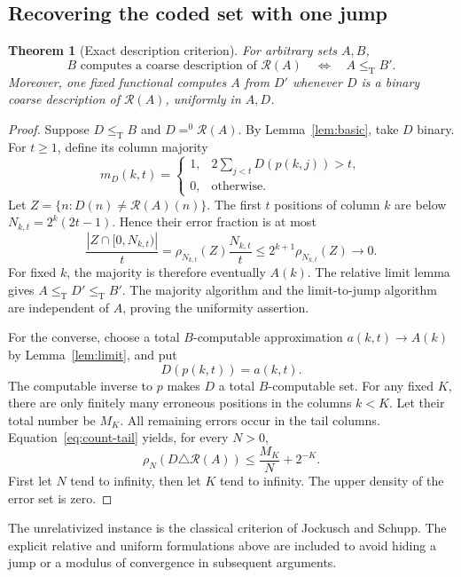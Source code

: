 \documentclass[11pt,a4paper]{article}
\newcommand{\leT}{\leq_{\mathrm T}}
\newcommand{\az}{\mathrel{=^{0}}}
\newcommand{\R}{\mathcal R}
\newtheorem{theorem}{Theorem}[section]
\theoremstyle{definition}\newtheorem{definition}[theorem]{Definition}
\theoremstyle{remark}\newtheorem{remark}[theorem]{Remark}
\begin{document}
\subsection{Recovering the coded set with one jump}
\begin{theorem}[Exact description criterion]\label{thm:criterion}
For arbitrary sets $A,B$,
\begin{equation}
 B\text{ computes a coarse description of }\R(A)
 \quad\Longleftrightarrow\quad A\leT B'.
 \label{eq:criterion}
\end{equation}
Moreover, one fixed functional computes $A$ from $D'$ whenever $D$ is a binary coarse description of $\R(A)$, uniformly in $A,D$.
\end{theorem}
\begin{proof}
Suppose $D\leT B$ and $D\az\R(A)$. By Lemma~\ref{lem:basic}, take $D$ binary. For $t\geq1$, define its column majority
\[
 m_D(k,t)=
 \begin{cases}
 1,&2\sum_{j<t}D(p(k,j))>t,\\
 0,&\text{otherwise}.
 \end{cases}
\]
Let $Z=\{n:D(n)\ne\R(A)(n)\}$. The first $t$ positions of column $k$ are below
$N_{k,t}=2^k(2t-1)$. Hence their error fraction is at most
\[
 \frac{|Z\cap[0,N_{k,t})|}{t}
 =\rho_{N_{k,t}}(Z)\frac{N_{k,t}}t
 \leq 2^{k+1}\rho_{N_{k,t}}(Z)\longrightarrow0.
\]
For fixed $k$, the majority is therefore eventually $A(k)$. The relative limit lemma gives $A\leT D'\leT B'$. The majority algorithm and the limit-to-jump algorithm are independent of $A$, proving the uniformity assertion.

For the converse, choose a total $B$-computable approximation $a(k,t)\to A(k)$ by Lemma~\ref{lem:limit}, and put
\[
 D(p(k,t))=a(k,t).
\]
The computable inverse to $p$ makes $D$ a total $B$-computable set. For any fixed $K$, there are only finitely many erroneous positions in the columns $k<K$. Let their total number be $M_K$. All remaining errors occur in the tail columns. Equation~\eqref{eq:count-tail} yields, for every $N>0$,
\begin{equation}
 \rho_N(D\triangle\R(A))\leq\frac{M_K}{N}+2^{-K}.
 \label{eq:limit-density}
\end{equation}
First let $N$ tend to infinity, then let $K$ tend to infinity. The upper density of the error set is zero.
\end{proof}

The unrelativized instance is the classical criterion of Jockusch and Schupp.\cite[Theorem~2.19]{JS} The explicit relative and uniform formulations above are included to avoid hiding a jump or a modulus of convergence in subsequent arguments.
\end{document}
